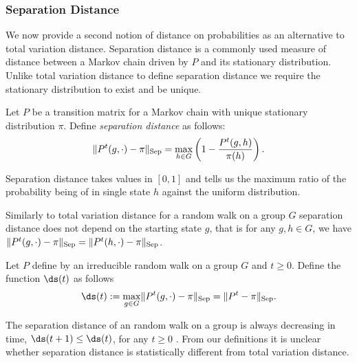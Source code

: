 \documentclass[11pt]{report}
\begin{document}
\subsubsection{Separation Distance}

We now provide a second notion of distance on probabilities as an alternative to total variation distance.
Separation distance is a commonly used measure of distance between a Markov 
chain driven by $P$ and its stationary distribution. Unlike total variation distance to 
define separation distance we require the stationary distribution to exist and 
be unique.

\begin{defn}
	Let $P$ be a transition matrix for a Markov chain with unique stationary distribution $\pi$. Define \emph{separation distance} as follows:
	\begin{eqnarray}
	\lVert P^{t}(g,\cdot) -\pi \rVert_{\textnormal{Sep}} = \max_{h \in G} 
	\left( 1 -\frac{P^{t}(g,h)}{\pi(h)}\right).
	\end{eqnarray}
\end{defn}


Separation distance takes values in $[0,1]$ and tells us the maximum ratio of the probability being of in single state $h$ against the uniform distribution.



Similarly to 
total variation distance for a random walk on a group $G$ separation distance does not depend on the starting state $g$, that is  for any $g,h \in G$, we have $\lVert P^{t}(g,\cdot) - \pi \rVert_{\textnormal{Sep}} = \lVert P^{t}(h,\cdot) - \pi \rVert_{\textnormal{Sep}}$. 















\begin{defn}
	Let $P$ define by an irreducible random walk on a group $G$ and 
	$t\geq 0$. Define the function $\ds(t)$  as follows
	\[\ds(t) := \max_{g\in G}\lVert P^{t}(g,\cdot)- \pi 
	\rVert_{\textnormal{Sep}} = \lVert P^{t} - \pi 
	\rVert_{\textnormal{Sep}}.\]
\end{defn}

The separation distance of an random walk on a group is always decreasing in time, $\ds(t+1) \leq \ds(t)$, for any $t\geq 0$ \cite[Section 6.4]{Levin2017}.
From our 
definitions it is unclear whether separation distance is statistically different 
from total variation distance. 
\end{document}
